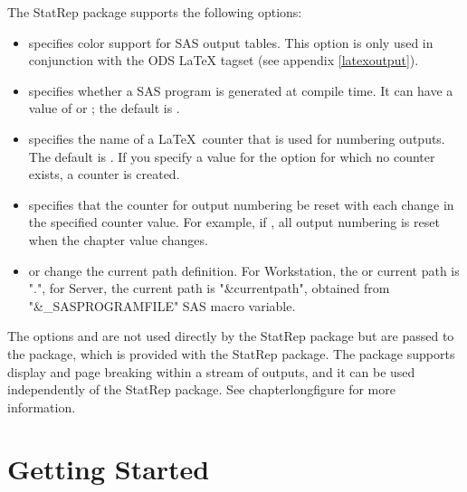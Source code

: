 \documentclass[article,oneside]{memoir}
\newcommand*{\StatRep}{\textsf{StatRep}\xspace}
\begin{document}
 The \StatRep package supports the following options:
     \begin{itemize}
     \item {} specifies color support for SAS output tables.
     This option is only used in conjunction with
     the ODS LaTeX tagset (see appendix \ref{latexoutput}).

     \item {} specifies whether a SAS program
     is generated at compile time. 
     It can have a value of  or ; the default is .

     \item {} specifies the name of a \LaTeX\ counter
     that is used for numbering outputs.
     The default is . If you specify a value for the 
     option for which no counter exists,
     a counter is created.

     \item {} specifies that the counter for output numbering be reset with
     each change in the specified counter value. For example, if ,
     all output numbering is reset when the chapter value changes.
     
     \item {} or  change the current path definition.
     For Workstation, the  or current path is ".", for Server, the current path is "\&currentpath", obtained from 
     "\&\_SASPROGRAMFILE" SAS macro variable.
     \end{itemize}

     The options  and  are not used directly by the \StatRep
     package but are passed to the  package, which
     is provided with the \StatRep package.
    The  package
    supports display and page breaking within a stream of outputs, and it can be
    used independently of the \StatRep package. See chapter{longfigure} for
more information.

\chapter{Getting Started}\label{gs}
\end{document}
